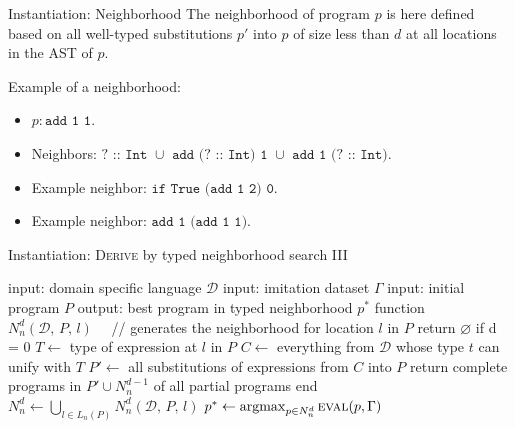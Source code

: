 \begin{frame}[fragile]{Instantiation: Neighborhood}
The neighborhood of program $p$ is here defined based on all well-typed substitutions $p'$ into $p$ of size less than $d$ at all locations in the AST of $p$. 

Example of a neighborhood:
\begin{itemize}
    \item $p: \texttt{add 1 1}$.
    \item Neighbors: $\texttt{? :: Int $\cup$ add (? :: Int) 1 $\cup$ add 1 (? :: Int)}$.
    \item Example neighbor: $\texttt{if True (add 1 2) 0}$.
    \item Example neighbor: $\texttt{add 1 (add 1 1)}$.
\end{itemize}
\end{frame}

\begin{frame}[fragile]{Instantiation: \textsc{Derive} by typed neighborhood search III}
    \begin{algorithm}[caption={Greedy search in the depth-limited typed neighborhood}]
     input: domain specific language $\mathcal{D}$
     input: imitation dataset $\Gamma$
     input: initial program $P$
     output: best program in typed neighborhood $p^*$
     function $N_n^d(\mathcal{D},\, P,\, l) \quad$ // generates the neighborhood for location $l$ in $P$
       return $\varnothing$ if d = 0
       $T \leftarrow $ type of expression at $l$ in $P$
       $C \leftarrow $ everything from $\mathcal{D}$ whose type $t$ can unify with $T$
       $P' \leftarrow $ all substitutions of expressions from $C$ into $P$
       return complete programs in $P' \cup N_n^{d-1}$ of all partial programs 
     end
     $N_n^d \leftarrow \bigcup_{l \in L_n(P)}N_n^d(\mathcal{D},\, P,\, l)$
     $p^* \leftarrow \operatorname*{argmax}_{p \in N_n^d}\textsc{eval}(p, \Gamma)$ 
    \end{algorithm}
\end{frame}


